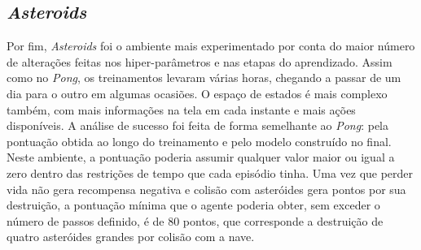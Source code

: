 \subsection{\textit{Asteroids}}
\label{sec:exp_asteroids}

Por fim, \textit{Asteroids} foi o ambiente mais experimentado por conta do maior número de alterações feitas nos hiper-parâmetros e nas etapas do aprendizado.
Assim como no \textit{Pong}, os treinamentos levaram várias horas, chegando a passar de um dia para o outro em algumas ocasiões.
O espaço de estados é mais complexo também, com mais informações na tela em cada instante e mais ações disponíveis.
A análise de sucesso foi feita de forma semelhante ao \textit{Pong}: pela pontuação obtida ao longo do treinamento e pelo modelo construído no final.
Neste ambiente, a pontuação poderia assumir qualquer valor maior ou igual a zero dentro das restrições de tempo que cada episódio tinha.
Uma vez que perder vida não gera recompensa negativa e colisão com asteróides gera pontos por sua destruição, a pontuação mínima que o agente poderia obter, sem exceder o número de passos definido, é de 80 pontos, que corresponde a destruição de quatro asteróides grandes por colisão com a nave.


%
%

